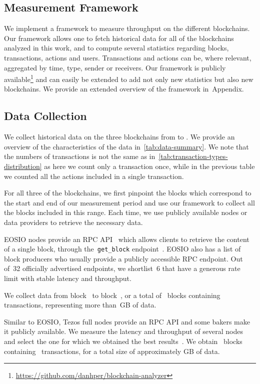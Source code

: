 \subsection{Measurement Framework}
We implement a framework to measure throughput on the different blockchains.
Our framework allows one to fetch historical data for all of the blockchains analyzed in this work, and to compute several statistics regarding blocks, transactions, actions and users.
Transactions and actions can be, where relevant, aggregated by time, type, sender or receivers.
Our framework is publicly available\footnote{\url{https://github.com/danhper/blockchain-analyzer}} and can easily be extended to add not only new statistics but also new blockchains.
We provide an extended overview of the framework in~Appendix.

\subsection{Data Collection}
We collect historical data on the three blockchains from \startdate to \finishdate.
We provide an overview of the characteristics of the data in~\autoref{tab:data-summary}.
We note that the numbers of transactions is not the same as in~\autoref{tab:transaction-types-distribution} as here we count only a transaction once, while in the previous table we counted all the actions included in a single transaction.

For all three of the blockchains, we first pinpoint the blocks which correspond to the start and end of our measurement period and use our framework to collect all the blocks included in this range.
Each time, we use publicly available nodes or data providers to retrieve the necessary data.

EOSIO nodes provide an RPC API~\cite{EOS.IO2020} which allows clients to retrieve the content of a single block, through the~\texttt{get\_block} endpoint~\cite{EOSDocs2020}.
EOSIO also has a list of block producers who usually provide a publicly accessible RPC endpoint. Out of~32 officially advertised endpoints, we shortlist~6 that have a generous rate limit with stable latency and throughput.

We collect data from block~\empirical{\numprint{\EOSStartBlock}} to block~\empirical{\numprint{\EOSEndBlock}}, or a total of~\empirical{\blockscount{\EOSStartBlock}{\EOSEndBlock}} blocks containing~ transactions, representing more than~GB of data.

Similar to EOSIO, Tezos full nodes provide an RPC API and some bakers make it publicly available. We measure the latency and throughput of several nodes and select the one for which we obtained the best results~\cite{tezos-ukraine}.
We obtain~\empirical{\blockscount{\TezosStartBlock}{\TezosEndBlock}} blocks containing~ transactions, for a total size of approximately  GB of data.

